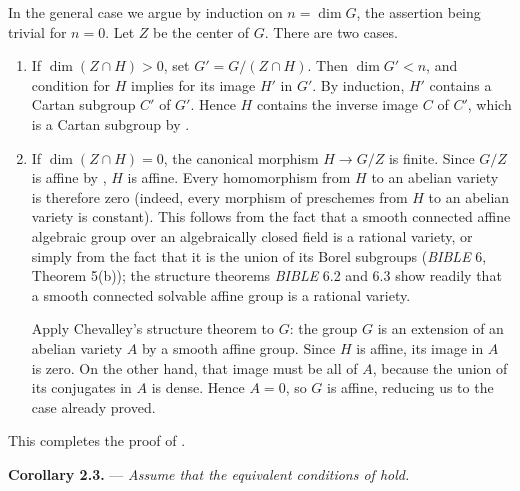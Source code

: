 In the general case we argue by induction on \(n=\dim G\), the
assertion being trivial for \(n=0\). Let \(Z\) be the center of
\(G\). There are two cases.

\begin{enumerate}
\item[\(1^\circ\)]  If \(\dim(Z\cap H)>0\), set
  \(G'=G/(Z\cap H)\). Then \(\dim G'<n\), and condition  for
  \(H\) implies  for its image \(H'\) in \(G'\).
  By induction, \(H'\) contains a Cartan subgroup \(C'\) of \(G'\).
  Hence \(H\) contains the inverse image \(C\) of \(C'\), which is a
  Cartan subgroup by .

\item[\(2^\circ\)]  If \(\dim(Z\cap H)=0\), the canonical morphism
  \(H\to G/Z\) is finite. Since \(G/Z\) is affine by , \(H\)
  is affine. Every homomorphism from \(H\) to an abelian variety is
  therefore zero (indeed, every morphism of preschemes from \(H\) to
  an abelian variety is constant). This follows from the fact that a
  smooth connected affine algebraic group over an algebraically
  closed field is a rational variety, or simply from the fact that
  it is the union of its Borel subgroups (\emph{BIBLE} 6,
  Theorem 5(b)); the structure theorems \emph{BIBLE} 6.2 and 6.3
  show readily that a smooth connected solvable affine group is a
  rational variety.

  Apply Chevalley's structure theorem to \(G\): the group \(G\) is
  an extension of an abelian variety \(A\) by a smooth affine group.
  Since \(H\) is affine, its image in \(A\) is zero. On the other
  hand, that image must be all of \(A\), because the union of its
  conjugates in \(A\) is dense. Hence \(A=0\), so \(G\) is affine,
  reducing us to the case already proved.
\end{enumerate}

This completes the proof of .

\medskip
\noindent{}\textbf{Corollary 2.3.} ---
\textit{Assume that the equivalent conditions of  hold.}

